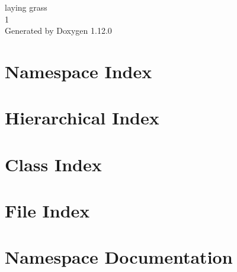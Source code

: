 \documentclass[twoside]{book}
\newcommand{\+}{\discretionary{\mbox{\scriptsize$\hookleftarrow$}}{}{}}
\newcommand{\clearemptydoublepage}{%
    \newpage{\pagestyle{empty}\cleardoublepage}%
  }
\begin{document}
  \raggedbottom
    \hypersetup{pageanchor=false,
                bookmarksnumbered=true,
                pdfencoding=unicode
               }
  \begin{titlepage}
  \vspace*{7cm}
  \begin{center}%
  {\Large laying grass}\\
  [1ex]\large 1 \\
  \vspace*{1cm}
  {\large Generated by Doxygen 1.12.0}\\
  \end{center}
  \end{titlepage}
  \clearemptydoublepage
  \tableofcontents
  \clearemptydoublepage
  \hypersetup{pageanchor=true}



\chapter{Namespace Index}

\chapter{Hierarchical Index}

\chapter{Class Index}

\chapter{File Index}

\chapter{Namespace Documentation}


\end{document}
